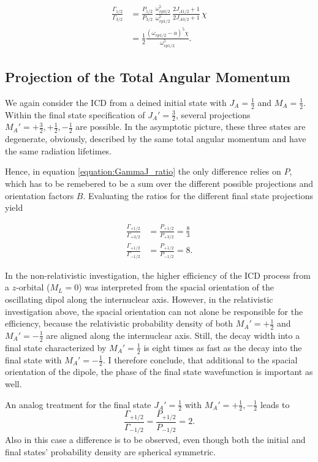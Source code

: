 \begin{align}
  \frac{\Gamma_{1/2}}{\Gamma_{3/2}}
  &= \frac{P_{1/2}}{P_{3/2}}
     \,\frac{\omega_{vp3/2}^5}{\omega_{vp1/2}^5}
     \,\frac{2J_{A1/2}+1}{2J_{A3/2}+1} \,\chi\\
  &= \frac 12 \frac{(\omega_{vp1/2} -a)^5 \chi}{\omega_{vp1/2}^5} .
\end{align}


\subsection{Projection of the Total Angular Momentum}
We again consider the ICD from a deined initial state with $J_A=\frac 12$ and
$M_A=\frac 12$. Within the final state specification of $J_A'=\frac 32$, several
projections $M_A'= +\frac 32, +\frac 12, -\frac 12$ are possible. In the asymptotic
picture, these three states are degenerate, obviously, described by the same
total angular momentum and have the same radiation lifetimes.

Hence, in equation \ref{equation:GammaJ_ratio} the only difference relies on $P$,
which has to be remebered to be a sum over the different possible projections
and orientation factors $B$. Evaluating the ratios for the different final state
projections yield

\begin{align}
  \frac{\Gamma_{+1/2}}{\Gamma_{+3/2}} &= \frac{P_{+1/2}}{P_{+3/2}} = \frac 83  \\
  \frac{\Gamma_{+1/2}}{\Gamma_{-1/2}} &= \frac{P_{+1/2}}{P_{-1/2}} = 8   .
\end{align}

In the non-relativistic investigation, the higher efficiency of the \ac{ICD} process
from a $z$-orbital ($M_L=0$) was interpreted from the spacial orientation of the
oscillating dipol along the internuclear axis.
However, in the relativistic investigation above, the spacial orientation
can not alone be responsible for the efficiency, because the relativistic
probability density of both $M_A'= +\frac 12$ and $M_A'= -\frac 12$ are aligned
along the internuclear axis. Still, the decay width into a final state characterized
by $M_A'= \frac 12$ is eight times as fast as the decay into the final state
with $M_A'= -\frac 12$. I therefore conclude, that additional to the spacial
orientation of the dipole, the phase of the final state wavefunction is
important as well.

An analog treatment for the final state $J_A'=\frac 12$ with $M_A'= +\frac 12, -\frac 12$
leads to
\begin{equation}
  \frac{\Gamma_{+1/2}}{\Gamma_{-1/2}} = \frac{P_{+1/2}}{P_{-1/2}} = 2  .
\end{equation}
Also in this case a difference is to be observed, even though both the initial
and final states' probability density are spherical symmetric.

